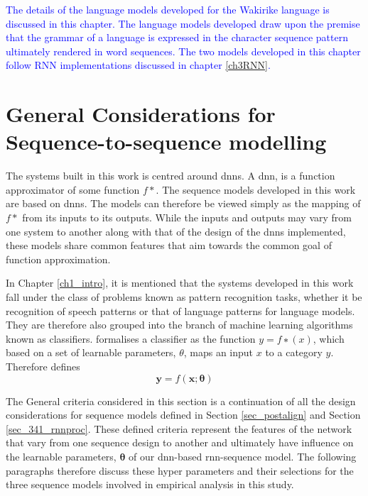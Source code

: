 
\textcolor{blue}{
The details of the language models developed for the Wakirike language is discussed in this chapter.  The language models developed draw  upon the premise that the grammar of a language is expressed in the character sequence pattern ultimately rendered in word sequences.  The two models developed in this chapter follow RNN implementations discussed in chapter \ref{ch3RNN}. }

\startblue
\section{General Considerations for Sequence-to-sequence modelling}\label{sec_c6_seqdesign}
The systems built in this work is centred around \acrfull{dnns}.  A \acrshort{dnn}, is a function approximator of some function $f\ast$. The sequence models developed in this work are based on \acrshort{dnns}.  The models can therefore be viewed simply as the mapping of $f\ast$ from its inputs to its outputs.  While the inputs and outputs may vary from one system to another along with that of the design of the \acrshort{dnn}s implemented, these models share common features that aim towards the common goal of function approximation.  

In Chapter \ref{ch1_intro}, it is mentioned that the systems developed in this work fall under the class of problems known as pattern recognition tasks, whether it be recognition of speech patterns or that of language patterns for language models.  They are therefore also grouped into the branch of machine learning algorithms known as classifiers.  \cite{Goodfellow-et-al-2016} formalises a classiﬁer as the function $y=f∗(x)$, which based on a set of learnable parameters, $\theta$, maps an input $x$ to a category $y$. Therefore defines
\begin{equation}\mathbf{y}=f(\mathbf{x;\theta})  \end{equation}\label{eq_c6_classifier}

The General criteria considered in this section is a continuation of all the design considerations for sequence models defined in Section \ref{sec_postalign} and Section \ref{sec_341_rnnproc}.  These defined criteria represent the features of the network that vary from one sequence design to another and ultimately have influence on the learnable parameters, $\mathbf{\theta}$ of our \acrshort{dnn}-based \acrshort{rnn}-sequence model. The following paragraphs therefore discuss these hyper parameters and their selections for the three sequence models involved in empirical analysis in this study.


